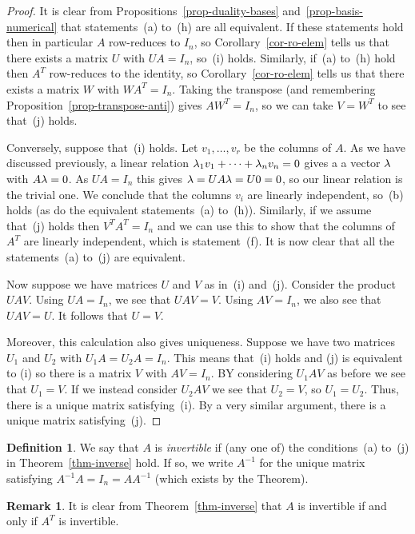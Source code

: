 \documentclass[reqno]{amsart}
\theoremstyle{definition}
\newtheorem{remark}[theorem]{Remark}
\newtheorem{definition}[theorem]{Definition}
\newcommand{\dfn}[1]{\emph{{#1}}\index{#1}}
\begin{document}
\begin{proof}
 It is clear from Propositions~\ref{prop-duality-bases}
 and~\ref{prop-basis-numerical} that statements~(a) to~(h) are all
 equivalent.  If these statements hold then in particular $A$
 row-reduces to $I_n$, so Corollary~\ref{cor-ro-elem} tells us that
 there exists a matrix $U$ with $UA=I_n$, so~(i) holds.  Similarly,
 if~(a) to~(h) hold then $A^T$ row-reduces to the identity, so
 Corollary~\ref{cor-ro-elem} tells us that there exists a matrix $W$
 with $WA^T=I_n$.  Taking the transpose (and remembering
 Proposition~\ref{prop-transpose-anti}) gives $AW^T=I_n$, so we can
 take $V=W^T$ to see that~(j) holds.

 Conversely, suppose that~(i) holds.  Let $v_1,\dotsc,v_r$ be the
 columns of $A$.  As we have discussed previously, a linear relation
 $\lambda_1v_1+\dotsb+\lambda_nv_n=0$ gives a a vector $\lambda$ with $A\lambda=0$.
 As $UA=I_n$ this gives $\lambda=UA\lambda=U0=0$, so our linear relation is
 the trivial one.  We conclude that the columns $v_i$ are linearly
 independent, so~(b) holds (as do the equivalent statements~(a)
 to~(h)).  Similarly, if we assume that~(j) holds then $V^TA^T=I_n$
 and we can use this to show that the columns of $A^T$ are linearly
 independent, which is statement~(f).  It is now clear that all the
 statements~(a) to~(j) are equivalent.

 Now suppose we have matrices $U$ and $V$ as in~(i) and~(j).  Consider
 the product $UAV$.  Using $UA=I_n$, we see that $UAV=V$.  Using
 $AV=I_n$, we also see that $UAV=U$.  It follows that $U=V$.

 Moreover, this calculation also gives uniqueness.  Suppose we have
 two matrices $U_1$ and $U_2$ with $U_1A=U_2A=I_n$.  This means
 that~(i) holds and (j) is equivalent to (i) so there is a matrix $V$
 with $AV=I_n$.  BY considering $U_1AV$ as before we see that
 $U_1=V$.  If we instead consider $U_2AV$ we see that $U_2=V$, so
 $U_1=U_2$.  Thus, there is a unique matrix satisfying~(i).  By a very
 similar argument, there is a unique matrix satisfying~(j).
\end{proof}

\begin{definition}\label{defn-invertible}
 We say that $A$ is \dfn{invertible} if (any one of) the
 conditions~(a) to~(j) in Theorem~\ref{thm-inverse} hold.  If so, we
 write $A^{-1}$ for the unique matrix satisfying $A^{-1}A=I_n=AA^{-1}$
 (which exists by the Theorem).
\end{definition}

\begin{remark}\label{rem-transpose-inverse}
 It is clear from Theorem~\ref{thm-inverse} that $A$ is invertible if
 and only if $A^T$ is invertible.
\end{remark}
\end{document}
